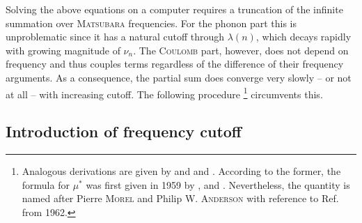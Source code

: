 Solving the above equations on a computer requires a truncation of the infinite
summation over \textsc{Matsubara} frequencies. For the phonon part this is
unproblematic since it has a natural cutoff through $\lambda(n)$, which decays
rapidly with growing magnitude of $\nu_n$. The \textsc{Coulomb} part, however,
does not depend on frequency and thus couples terms regardless of the difference
of their frequency arguments. As a consequence, the partial sum does converge
very slowly -- or not at all -- with increasing cutoff. The following procedure%
%
\footnote{Analogous derivations are given by 
\cite[185-188]{Schrieffer83} and  and 
\cite[Sec.~9]{AllenMitrovic82}. According to the former, the formula for $\mu^*$
was first given in 1959 by ,  and
 \cite[83]{BogoliubovTolmachevShirkov59}. Nevertheless, the
quantity is named after Pierre \textsc{Morel} and Philip W. \textsc{Anderson}
with reference to Ref.~ from 1962.}
%
circumvents this.

\subsection{Introduction of frequency cutoff}
\label{introduction of frequency cutoff}

